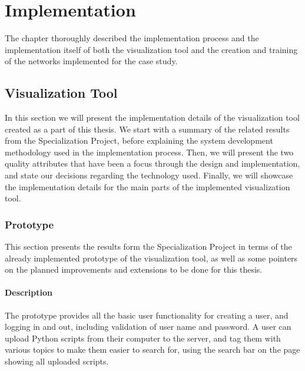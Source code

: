 
\chapter{Implementation}\label{implementation-chap}

The chapter thoroughly described the implementation process and the implementation itself of both the visualization tool and the creation and training of the networks implemented for the case study.

\section{Visualization Tool}

In this section we will present the implementation details of the visualization tool created as a part of this thesis. We start with a summary of the related results from the Specialization Project, before explaining the system development methodology used in the implementation process. Then, we will present the two quality attributes that have been a focus through the design and implementation, and state our decisions regarding the technology used. Finally, we will showcase the implementation details for the main parts of the implemented visualization tool.

\subsection{Prototype}

This section presents the results form the Specialization Project in terms of the already implemented prototype of the visualization tool, as well as some pointers on the planned improvements and extensions to be done for this thesis.

\subsubsection{Description}


\noindent The prototype provides all the basic user functionality for creating a user, and logging in and out, including validation of user name and password. A user can upload Python scripts from their computer to the server, and tag them with various topics to make them easier to search for, using the search bar on the page showing all uploaded scripts. \\

